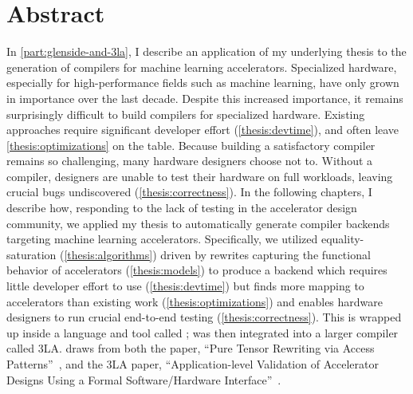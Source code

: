 \chapter*{ Abstract}

In \cref{part:glenside-and-3la},
  I describe an application of my underlying thesis
  to the generation of compilers
  for machine learning \glspl{accelerator}.
Specialized hardware, especially for high-performance fields
  such as machine learning,
  have only grown in importance
  over the last decade.
Despite this increased importance,
  it remains surprisingly difficult
  to build compilers for specialized hardware.
Existing approaches
  require significant
  developer effort (\cref{thesis:devtime}),
  and 
  often leave
  \cref{thesis:optimizations} on the table.
Because building a satisfactory compiler
  remains so challenging,
  many hardware designers choose not to.
Without a compiler,
  designers are unable to test
  their hardware on full workloads,
  leaving crucial bugs undiscovered
  (\cref{thesis:correctness}).
In the following chapters,
  I describe how,
  responding to the lack of testing
  in the accelerator design
  community,
  we applied
  my thesis
  to automatically generate compiler backends
  targeting machine learning accelerators.
Specifically, we utilized
  \gls{equality-saturation}
  (\cref{thesis:algorithms})
  driven by rewrites capturing
  the functional behavior of accelerators
  (\cref{thesis:models})
  to produce a backend
  which 
  requires little developer effort to use
  (\cref{thesis:devtime})
  but finds more mapping to accelerators
  than existing work
  (\cref{thesis:optimizations})
  and enables hardware designers to run
  crucial end-to-end testing
  (\cref{thesis:correctness}).
This is wrapped up inside a language and tool called
  \g;
  \g was then integrated into a larger compiler
  called 3LA.
 draws from both the 
  \g paper,
  ``Pure Tensor Rewriting via Access Patterns''~\cite{smith2021pure},
  and the 
  3LA paper,
  ``Application-level Validation of Accelerator Designs Using a Formal Software/Hardware Interface''~\cite{huang2024application}.
